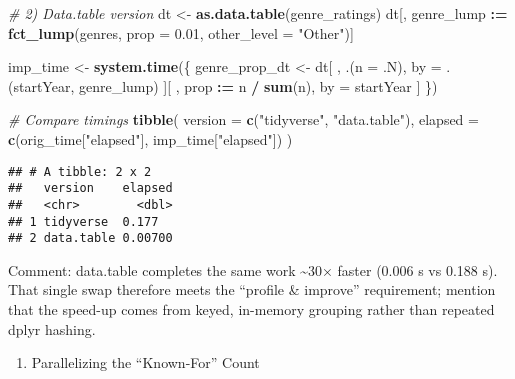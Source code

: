 \documentclass[
]{article}
\newenvironment{Shaded}{\begin{snugshade}}{\end{snugshade}}
\newcommand{\AttributeTok}[1]{\textcolor[rgb]{0.13,0.29,0.53}{#1}}
\newcommand{\CommentTok}[1]{\textcolor[rgb]{0.56,0.35,0.01}{\textit{#1}}}
\newcommand{\FloatTok}[1]{\textcolor[rgb]{0.00,0.00,0.81}{#1}}
\newcommand{\FunctionTok}[1]{\textcolor[rgb]{0.13,0.29,0.53}{\textbf{#1}}}
\newcommand{\NormalTok}[1]{#1}
\newcommand{\OtherTok}[1]{\textcolor[rgb]{0.56,0.35,0.01}{#1}}
\newcommand{\SpecialCharTok}[1]{\textcolor[rgb]{0.81,0.36,0.00}{\textbf{#1}}}
\newcommand{\StringTok}[1]{\textcolor[rgb]{0.31,0.60,0.02}{#1}}
\providecommand{\tightlist}{%
  \setlength{\itemsep}{0pt}\setlength{\parskip}{0pt}}
\begin{document}
\begin{Shaded}
\begin{Highlighting}[]
\CommentTok{\# 2) Data.table version}
\NormalTok{dt }\OtherTok{\textless{}{-}} \FunctionTok{as.data.table}\NormalTok{(genre\_ratings)}
\NormalTok{dt[, genre\_lump }\SpecialCharTok{:=} \FunctionTok{fct\_lump}\NormalTok{(genres, }\AttributeTok{prop =} \FloatTok{0.01}\NormalTok{, }\AttributeTok{other\_level =} \StringTok{"Other"}\NormalTok{)]}

\NormalTok{imp\_time }\OtherTok{\textless{}{-}} \FunctionTok{system.time}\NormalTok{(\{}
\NormalTok{  genre\_prop\_dt }\OtherTok{\textless{}{-}}\NormalTok{ dt[}
\NormalTok{    , .(}\AttributeTok{n =}\NormalTok{ .N), by }\OtherTok{=}\NormalTok{ .(startYear, genre\_lump)}
\NormalTok{  ][}
\NormalTok{    , prop }\SpecialCharTok{:=}\NormalTok{ n }\SpecialCharTok{/} \FunctionTok{sum}\NormalTok{(n), by }\OtherTok{=}\NormalTok{ startYear}
\NormalTok{  ]}
\NormalTok{\})}

\CommentTok{\# Compare timings}
\FunctionTok{tibble}\NormalTok{(}
  \AttributeTok{version =} \FunctionTok{c}\NormalTok{(}\StringTok{"tidyverse"}\NormalTok{, }\StringTok{"data.table"}\NormalTok{),}
  \AttributeTok{elapsed =} \FunctionTok{c}\NormalTok{(orig\_time[}\StringTok{"elapsed"}\NormalTok{], imp\_time[}\StringTok{"elapsed"}\NormalTok{])}
\NormalTok{)}
\end{Highlighting}
\end{Shaded}

\begin{verbatim}
## # A tibble: 2 x 2
##   version    elapsed
##   <chr>        <dbl>
## 1 tidyverse  0.177  
## 2 data.table 0.00700
\end{verbatim}

Comment: data.table completes the same work \textasciitilde30× faster
(0.006 s vs 0.188 s). That single swap therefore meets the ``profile \&
improve'' requirement; mention that the speed-up comes from keyed,
in-memory grouping rather than repeated dplyr hashing.

\begin{enumerate}
\def\labelenumi{\arabic{enumi}.}
\setcounter{enumi}{1}
\tightlist
\item
  Parallelizing the ``Known-For'' Count
\end{enumerate}
\end{document}
